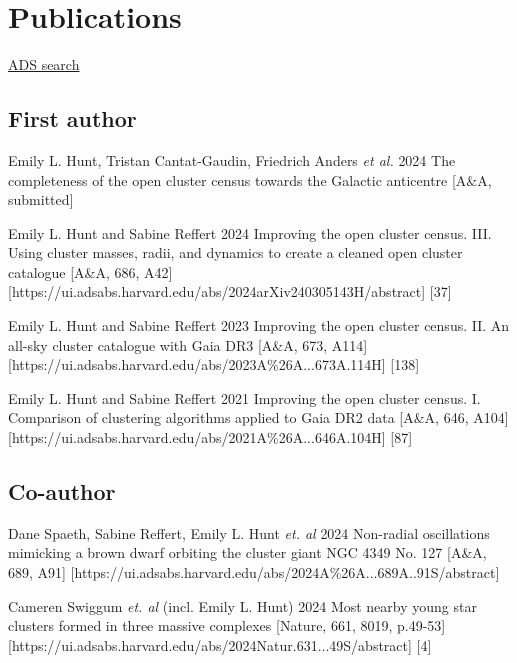 \section*{Publications}

\href{\cvADSLink}{ADS search \faLink}%


\subsection*{First author}

\begin{etaremune}
    \item \publication
        {Emily L. Hunt, Tristan Cantat-Gaudin, Friedrich Anders \emph{et al.}}
        {2024}
        {The completeness of the open cluster census towards the Galactic anticentre}
        [A\&A, submitted]
    \item \publication
        {Emily L. Hunt and Sabine Reffert}
        {2024}
        {Improving the open cluster census. III. Using cluster masses, radii, and dynamics to create a cleaned open cluster catalogue}
        [A\&A, 686, A42]
        [https://ui.adsabs.harvard.edu/abs/2024arXiv240305143H/abstract]
        [37]
    \item \publication
        {Emily L. Hunt and Sabine Reffert}
        {2023}
        {Improving the open cluster census. II. An all-sky cluster catalogue with Gaia DR3}
        [A\&A, 673, A114]
        [https://ui.adsabs.harvard.edu/abs/2023A\%26A...673A.114H]
        [138]
    \item \publication
        {Emily L. Hunt and Sabine Reffert}
        {2021}
        {Improving the open cluster census. I. Comparison of clustering algorithms applied to Gaia DR2 data}
        [A\&A, 646, A104]
        [https://ui.adsabs.harvard.edu/abs/2021A\%26A...646A.104H]
        [87]
\end{etaremune}


\subsection*{Co-author}

\begin{etaremune}
    \item \publication
        {Dane Spaeth, Sabine Reffert, Emily L. Hunt \emph{et. al}}
        {2024}
        {Non-radial oscillations mimicking a brown dwarf orbiting the cluster giant NGC 4349 No. 127}
        [A\&A, 689, A91]
        [https://ui.adsabs.harvard.edu/abs/2024A\%26A...689A..91S/abstract]
    \item \publication
        {Cameren Swiggum \emph{et. al} (incl. Emily L. Hunt)}
        {2024}
        {Most nearby young star clusters formed in three massive complexes }
        [Nature, 661, 8019, p.49-53]
        [https://ui.adsabs.harvard.edu/abs/2024Natur.631...49S/abstract]
        [4]
\end{etaremune}
